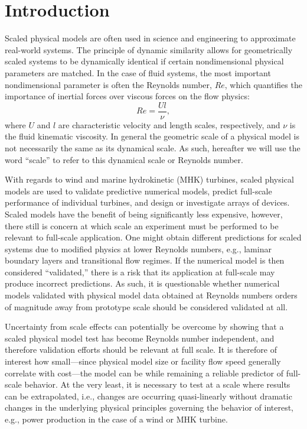 \documentclass[energies,article,accept,moreauthors,pdftex,12pt,a4paper]{mdpi}
\begin{document}
\linenumbers


\section{Introduction}

Scaled physical models are often used in science and engineering to approximate
real-world systems. The principle of dynamic similarity allows for geometrically
scaled systems to be dynamically identical if certain nondimensional
physical parameters are matched. In the case of fluid systems, the most
important nondimensional parameter is often the Reynolds number, $Re$, which
quantifies the importance of inertial forces over viscous forces on the flow
physics:
\begin{equation}
    Re = \frac{Ul}{\nu},
    \label{eq:Re}
\end{equation}
where $U$ and $l$ are characteristic velocity and length scales, respectively,
and $\nu$ is the fluid kinematic viscosity. In general the geometric scale of a
physical model is not necessarily the same as its dynamical scale. As such,
hereafter we will use the word ``scale'' to refer to this dynamical scale or
Reynolds number.

With regards to wind and marine hydrokinetic (MHK) turbines, scaled physical
models are used to validate predictive numerical models, predict full-scale
performance of individual turbines, and design or investigate arrays of devices.
Scaled models have the benefit of being significantly less expensive, however,
there still is concern at which scale an experiment must be performed to be
relevant to full-scale application. One might obtain different predictions for
scaled systems due to modified physics at lower Reynolds numbers, e.g., laminar
boundary layers and transitional flow regimes. If the numerical model is then
considered ``validated,'' there is a risk that its application at full-scale may
produce incorrect predictions. As such, it is questionable whether numerical
models validated with physical model data obtained at Reynolds numbers orders of
magnitude away from prototype scale should be considered validated at all.

Uncertainty from scale effects can potentially be overcome by showing that a
scaled physical model test has become Reynolds number independent, and therefore
validation efforts should be relevant at full scale. It is therefore of interest
how small---since physical model size or facility flow speed generally correlate
with cost---the model can be while remaining a reliable predictor of full-scale
behavior. At the very least, it is necessary to test at a scale where results
can be extrapolated, i.e., changes are occurring quasi-linearly without dramatic
changes in the underlying physical principles governing the behavior of
interest, e.g., power production in the case of a wind or MHK turbine.
\end{document}

